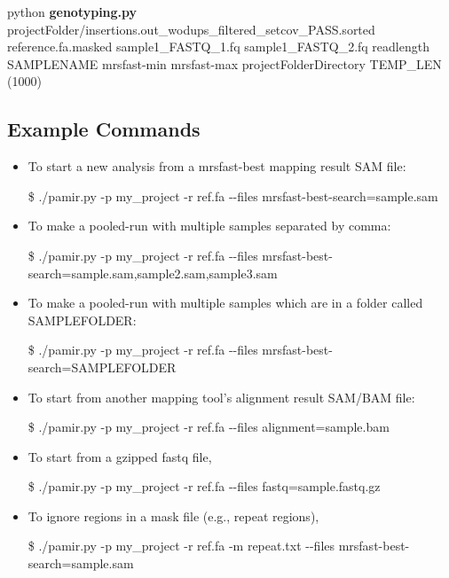 \documentclass{article}
\begin{document}
python \textbf{genotyping.py} projectFolder/insertions.out\_wodups\_filtered\_setcov\_PASS.sorted reference.fa.masked sample1\_FASTQ\_1.fq sample1\_FASTQ\_2.fq readlength SAMPLENAME mrsfast-min mrsfast-max projectFolderDirectory TEMP_LEN (1000)

\subsection{Example Commands}
\begin{itemize}

\item To start a new analysis from a mrsfast-best mapping result SAM file:
\begin{flushleft}
\$ ./pamir.py -p my\_project -r ref.fa -{}-files mrsfast-best-search=sample.sam
\end{flushleft}

\item To make a pooled-run with multiple samples separated by comma: 
\begin{flushleft}
\$ ./pamir.py -p my\_project -r ref.fa  -{}-files mrsfast-best-search=sample.sam,sample2.sam,sample3.sam
\end{flushleft}

\item To make a pooled-run with multiple samples which are in a folder called SAMPLEFOLDER: 
\begin{flushleft}
\$ ./pamir.py -p my\_project -r ref.fa  -{}-files mrsfast-best-search=SAMPLEFOLDER
\end{flushleft}

\item To start from another mapping tool's alignment result SAM/BAM file:
\begin{flushleft}
\$ ./pamir.py -p my\_project -r ref.fa -{}-files alignment=sample.bam
\end{flushleft}

\item To start from a gzipped fastq file,
\begin{flushleft}
\$ ./pamir.py -p my\_project -r ref.fa -{}-files fastq=sample.fastq.gz
\end{flushleft}

\item To ignore regions in a mask file (e.g., repeat regions), 
\begin{flushleft}
\$ ./pamir.py -p my\_project -r ref.fa -m repeat.txt -{}-files mrsfast-best-search=sample.sam
\end{flushleft}


\end{itemize}
\end{document}
